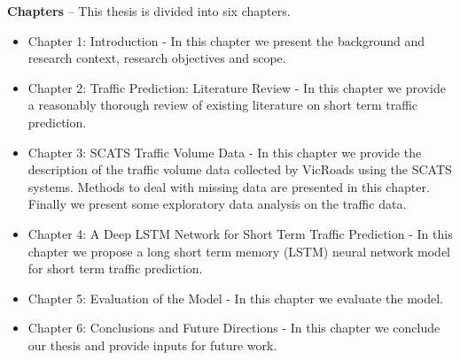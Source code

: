 \textbf{Chapters} -- This thesis is divided into six chapters.

\begin{itemize}
\item Chapter 1: Introduction - In this chapter we present the background and research context,
research objectives and scope.

\item Chapter 2: Traffic Prediction: Literature Review - In this chapter we provide a reasonably
thorough review of existing literature on short term traffic prediction.

\item Chapter 3: SCATS Traffic Volume Data - In this chapter we provide the description of the
traffic volume data collected by VicRoads using the SCATS systems. Methods to deal with missing
data are presented in this chapter. Finally we present some exploratory data analysis on the
traffic data.

\item Chapter 4: A Deep LSTM Network for Short Term Traffic Prediction - In this chapter we propose
a long short term memory (LSTM) neural network model for short term traffic prediction.

\item Chapter 5: Evaluation of the Model - In this chapter we evaluate the model.

\item Chapter 6: Conclusions and Future Directions - In this chapter we conclude our thesis and
provide inputs for future work.
\end{itemize}
